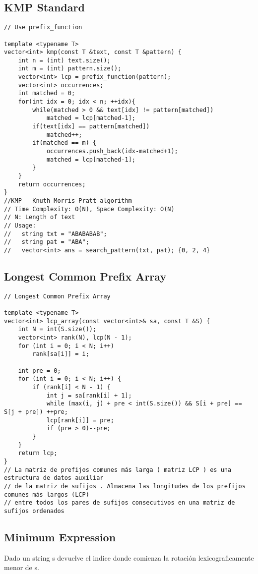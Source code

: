 \documentclass[10pt,letterpaper,twocolumn,twosided]{article}
\begin{document}
\subsection{KMP Standard}
\begin{lstlisting}
// Use prefix_function

template <typename T>
vector<int> kmp(const T &text, const T &pattern) {
    int n = (int) text.size();
    int m = (int) pattern.size();
    vector<int> lcp = prefix_function(pattern);
    vector<int> occurrences;
    int matched = 0;
    for(int idx = 0; idx < n; ++idx){
        while(matched > 0 && text[idx] != pattern[matched])
            matched = lcp[matched-1];
        if(text[idx] == pattern[matched])
            matched++;
        if(matched == m) {
            occurrences.push_back(idx-matched+1);
            matched = lcp[matched-1];
        }
    }
    return occurrences;
}
//KMP - Knuth-Morris-Pratt algorithm 
// Time Complexity: O(N), Space Complexity: O(N)
// N: Length of text
// Usage:
//   string txt = "ABABABAB"; 
//   string pat = "ABA";  
//   vector<int> ans = search_pattern(txt, pat); {0, 2, 4}
\end{lstlisting}

\subsection{Longest Common Prefix Array}
\begin{lstlisting}
// Longest Common Prefix Array

template <typename T>
vector<int> lcp_array(const vector<int>& sa, const T &S) {
    int N = int(S.size());
    vector<int> rank(N), lcp(N - 1);
    for (int i = 0; i < N; i++)
        rank[sa[i]] = i;

    int pre = 0;
    for (int i = 0; i < N; i++) {
        if (rank[i] < N - 1) {
            int j = sa[rank[i] + 1];
            while (max(i, j) + pre < int(S.size()) && S[i + pre] == S[j + pre]) ++pre;
            lcp[rank[i]] = pre;
            if (pre > 0)--pre;
        }
    }
    return lcp;
}
// La matriz de prefijos comunes más larga ( matriz LCP ) es una estructura de datos auxiliar
// de la matriz de sufijos . Almacena las longitudes de los prefijos comunes más largos (LCP)
// entre todos los pares de sufijos consecutivos en una matriz de sufijos ordenados
\end{lstlisting}

\subsection{Minimum Expression}
Dado un string s devuelve el indice donde comienza la rotación lexicograficamente menor de s.
\end{document}
